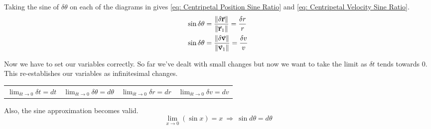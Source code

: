 \documentclass[main.tex]{subfiles}
\begin{document}
                    \FloatBarrier
                    
                    Taking the sine of $\delta \theta$ on each of the diagrams in  gives \eqref{eq: Centripetal Position Sine Ratio} and \eqref{eq: Centripetal Velocity Sine Ratio}.
                    \begin{align}
                        \sin\delta \theta &= \frac{\vmod{\delta \vect{r}}}{\vmod{\vect{r}_1}} = \frac{\delta r}{r} \label{eq: Centripetal Position Sine Ratio}\\
                        \sin\delta \theta &= \frac{\vmod{\delta \vect{v}}}{\vmod{\vect{v}_1}} = \frac{\delta v}{v} \label{eq: Centripetal Velocity Sine Ratio}
                    \end{align}

                    Now we have to set our variables correctly. So far we've dealt with small changes but now we want to take the limit as $\delta t$ tends towards 0.\\
                    This re-establishes our variables as infinitesimal changes.

                    \begin{center}
                        \begin{tabularx}{\textwidth}{X X X c}
                            {\centering $\displaystyle\lim_{\delta t \to 0} \delta t = dt$} & $\displaystyle\lim_{\delta t \to 0} \delta \theta = d\theta$ & $\displaystyle\lim_{\delta t \to 0} \delta r = dr$ & $\displaystyle\lim_{\delta t \to 0} \delta v = dv$
                        \end{tabularx}
                    \end{center}
  
                    Also, the sine approximation becomes valid.
                    \begin{equation*}
                        \lim_{x \to 0} \left(\sin x\right) = x \ \Longrightarrow \ \sin d\theta = d\theta
                    \end{equation*}
\end{document}
